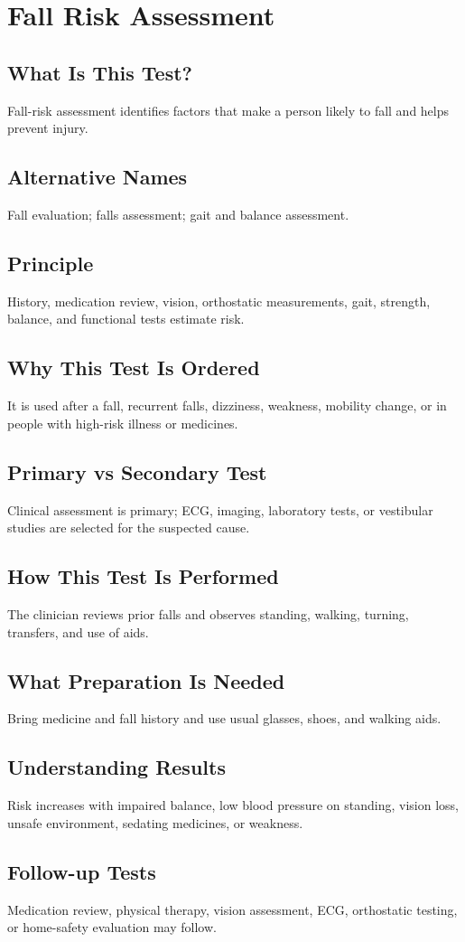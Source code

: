 \chapter{Fall Risk Assessment}
\section*{What Is This Test?} Fall-risk assessment identifies factors that make a person likely to fall and helps prevent injury.
\section*{Alternative Names} Fall evaluation; falls assessment; gait and balance assessment.
\section*{Principle} History, medication review, vision, orthostatic measurements, gait, strength, balance, and functional tests estimate risk.
\section*{Why This Test Is Ordered} It is used after a fall, recurrent falls, dizziness, weakness, mobility change, or in people with high-risk illness or medicines.
\section*{Primary vs Secondary Test} Clinical assessment is primary; ECG, imaging, laboratory tests, or vestibular studies are selected for the suspected cause.
\section*{How This Test Is Performed} The clinician reviews prior falls and observes standing, walking, turning, transfers, and use of aids.
\section*{What Preparation Is Needed} Bring medicine and fall history and use usual glasses, shoes, and walking aids.
\section*{Understanding Results} Risk increases with impaired balance, low blood pressure on standing, vision loss, unsafe environment, sedating medicines, or weakness.
\section*{Follow-up Tests} Medication review, physical therapy, vision assessment, ECG, orthostatic testing, or home-safety evaluation may follow.

